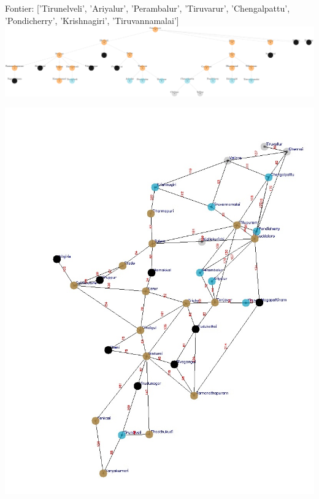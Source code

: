 \documentclass[xcolor=table]{beamer}
\begin{document}
\begin{frame}
  { \tiny Fontier: ['Tirunelveli', 'Ariyalur', 'Perambalur', 'Tiruvarur', 'Chengalpattu', 'Pondicherry', 'Krishnagiri', 'Tiruvannamalai']}
  \includegraphics[width=1\textwidth]{../BFSNodes/33-1.png}
  \begin{center}
    \includegraphics[height=0.6\textheight]{../BFSoutput/tamilBFS31.jpg}
  \end{center}
\end{frame}
\end{document}
